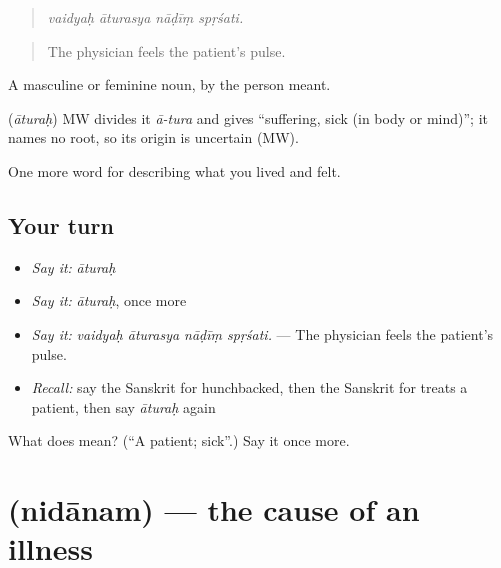\begin{quote}
   
\end{quote}

\begin{quote}
\emph{vaidyaḥ āturasya nāḍīṃ spṛśati.}
\end{quote}

\begin{quote}
The physician feels the patient's pulse.
\end{quote}

A masculine or feminine noun, by the person meant.

\begin{cousinweb}
\textbf{} (\emph{āturaḥ}) MW divides it \emph{ā-tura} and gives \textquotedblleft{}suffering, sick (in body or mind)\textquotedblright{}; it names no root, so its origin is uncertain (MW).
\end{cousinweb}

\begin{grammarlens}[title={What you've built}]
One more word for describing what you lived and felt.
\end{grammarlens}

\subsection*{Your turn}
\begin{itemize}
\raggedright
  \item \emph{Say it:} \emph{āturaḥ}
  \item \emph{Say it:} \emph{āturaḥ}, once more
  \item \emph{Say it:} \emph{vaidyaḥ āturasya nāḍīṃ spṛśati.} — The physician feels the patient's pulse.
  \item \emph{Recall:} say the Sanskrit for hunchbacked, then the Sanskrit for treats a patient, then say \emph{āturaḥ} again
\end{itemize}

\begin{tcolorbox}[breakable,colback=teal!4,colframe=teal!35!black,title={Before you move on}]
What does  mean? (\textquotedblleft{}A patient; sick\textquotedblright{}.) Say it once more.
\end{tcolorbox}
\section[\texorpdfstring{\sk{निदानम्} (nidānam)}{निदानम् (nidānam)}]{ (nidānam) — the cause of an illness}

